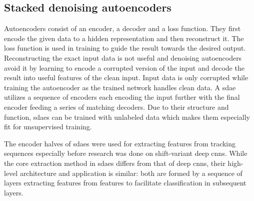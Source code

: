 \subsection{Stacked denoising autoencoders}
Autoencoders consist of an encoder, a decoder and a loss function. They first encode the given data to a hidden representation and then reconstruct it. The loss function is used in training to guide the result towards the desired output. Reconstructing the exact input data is not useful and denoising autoencoders avoid it by learning to encode a corrupted version of the input and decode the result into useful features of the clean input. Input data is only corrupted while training the autoencoder as the trained network handles clean data. A \ac{sdae} utilizes a sequence of encoders each encoding the input further with the final encoder feeding a series of matching decoders. Due to their structure and function, \ac{sdae}s can be trained with unlabeled data which makes them especially fit for unsupervised training.~\cite{SDAE}

The encoder halves of \ac{sdae}s were used for extracting features from tracking sequences especially before research was done on shift-variant deep \ac{cnn}s. While the core extraction method in \ac{sdae}s differs from that of deep \ac{cnn}s, their high-level architecture and application is similar: both are formed by a sequence of layers extracting features from features to facilitate classification in subsequent layers.
